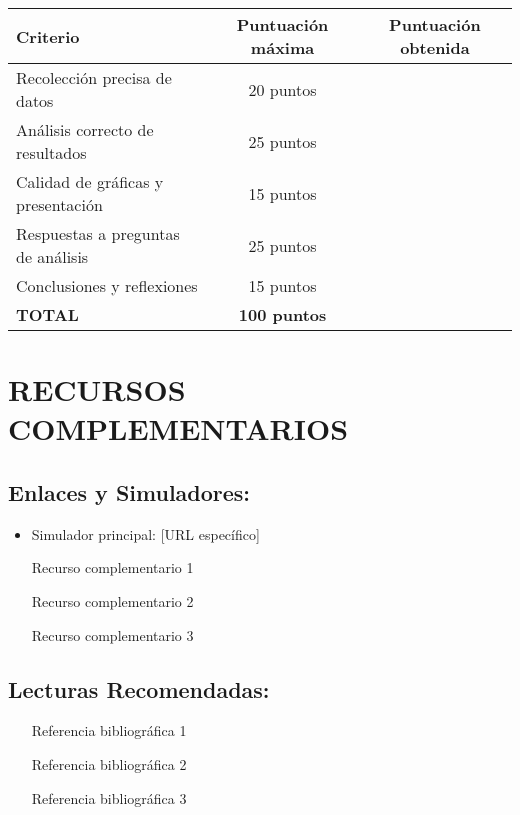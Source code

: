 \documentclass[12pt,a4paper]{article}
\begin{document}
	\begin{center}
		\begin{tabular}{|l|c|c|}
			\hline
			\textbf{Criterio} & \textbf{Puntuación máxima} & \textbf{Puntuación obtenida} \\
			\hline
			Recolección precisa de datos & 20 puntos & \\
			\hline
			Análisis correcto de resultados & 25 puntos & \\
			\hline
			Calidad de gráficas y presentación & 15 puntos & \\
			\hline
			Respuestas a preguntas de análisis & 25 puntos & \\
			\hline
			Conclusiones y reflexiones & 15 puntos & \\
			\hline
			\textbf{TOTAL} & \textbf{100 puntos} & \\
			\hline
		\end{tabular}
	\end{center}
	
	
	\section{RECURSOS COMPLEMENTARIOS}
	
	\subsection{Enlaces y Simuladores:}
	\begin{itemize}
		\item Simulador principal: [URL específico]
		\item [Recurso complementario 1]
		\item [Recurso complementario 2]
		\item [Recurso complementario 3]
	\end{itemize}
	
	\subsection{Lecturas Recomendadas:}
	\begin{itemize}
		\item [Referencia bibliográfica 1]
		\item [Referencia bibliográfica 2]
		\item [Referencia bibliográfica 3]
	\end{itemize}
	
\end{document}
